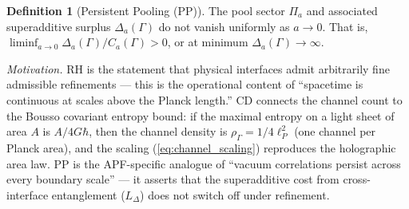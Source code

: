 \documentclass[11pt,a4paper]{article}
\theoremstyle{definition}
\newtheorem{definition}[theorem]{Definition}
\begin{document}
\begin{definition}[Persistent Pooling (PP)]\label{def:PP}
The pool sector $\Pi_a$ and associated superadditive surplus
$\Delta_a(\Gamma)$ do not vanish uniformly as $a \to 0$.  That is,
$\liminf_{a \to 0} \Delta_a(\Gamma) / C_a(\Gamma) > 0$, or at
minimum $\Delta_a(\Gamma) \to \infty$.
\end{definition}

\noindent\textit{Motivation.}\quad
RH is the statement that physical interfaces admit arbitrarily fine
admissible refinements --- this is the operational content of
``spacetime is continuous at scales above the Planck length.''
CD connects the channel count to the Bousso covariant entropy bound:
if the maximal entropy on a light sheet of area $A$ is
$A / 4G\hbar$, then the channel density is
$\rho_\Gamma = 1 / 4\ell_P^2$ (one channel per Planck area), and
the scaling (\ref{eq:channel_scaling}) reproduces the holographic
area law.  PP is the APF-specific analogue of ``vacuum correlations
persist across every boundary scale'' --- it asserts that the
superadditive cost from cross-interface entanglement
($L_\Delta$) does not switch off under refinement.
\end{document}

